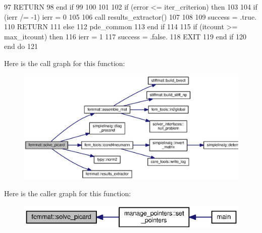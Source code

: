 \begin{DoxyCode}
97           \textcolor{keywordflow}{RETURN}
98 \textcolor{keywordflow}{        end if}
99 
100 
101 
102         \textcolor{keywordflow}{if} (error <= iter_criterion) \textcolor{keywordflow}{then}
103         
104           \textcolor{keywordflow}{if} (ierr /= -1) ierr = 0
105           
106           \textcolor{keyword}{call }results_extractor()
107           
108 
109           success = .true.
110           \textcolor{keywordflow}{RETURN}
111         \textcolor{keywordflow}{else}
112           pde_common%
113 \textcolor{keywordflow}{        end if}
114 
115         \textcolor{keywordflow}{if} (itcount >= max_itcount) \textcolor{keywordflow}{then}
116           ierr = 1
117           success = .false.
118           \textcolor{keywordflow}{EXIT}
119 \textcolor{keywordflow}{        end if}
120 \textcolor{keywordflow}{      end do}
121 
\end{DoxyCode}


Here is the call graph for this function\+:\nopagebreak
\begin{figure}[H]
\begin{center}
\leavevmode
\includegraphics[width=350pt]{namespacefemmat_a52b471f60b8aeb92d66b95268970a0ac_cgraph}
\end{center}
\end{figure}




Here is the caller graph for this function\+:\nopagebreak
\begin{figure}[H]
\begin{center}
\leavevmode
\includegraphics[width=350pt]{namespacefemmat_a52b471f60b8aeb92d66b95268970a0ac_icgraph}
\end{center}
\end{figure}


